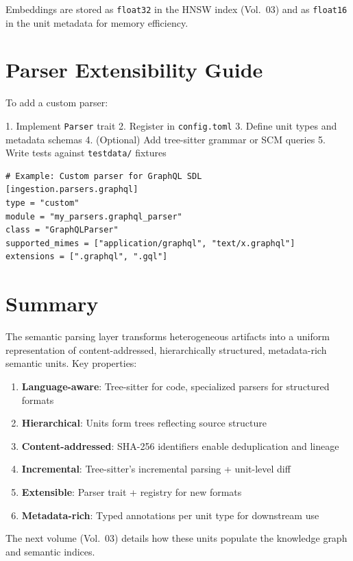 Embeddings are stored as \texttt{float32} in the HNSW index (Vol.~03) and as \texttt{float16} in the unit metadata for memory efficiency.

\section{Parser Extensibility Guide}
\label{sec:parsing:extensibility}

To add a custom parser:

1. Implement \texttt{Parser} trait
2. Register in \texttt{config.toml}
3. Define unit types and metadata schemas
4. (Optional) Add tree-sitter grammar or SCM queries
5. Write tests against \texttt{testdata/} fixtures

\begin{verbatim}
# Example: Custom parser for GraphQL SDL
[ingestion.parsers.graphql]
type = "custom"
module = "my_parsers.graphql_parser"
class = "GraphQLParser"
supported_mimes = ["application/graphql", "text/x.graphql"]
extensions = [".graphql", ".gql"]
\end{verbatim}

\section{Summary}
\label{sec:parsing:summary}

The semantic parsing layer transforms heterogeneous artifacts into a uniform representation of content-addressed, hierarchically structured, metadata-rich semantic units. Key properties:

\begin{enumerate}
  \item \textbf{Language-aware}: Tree-sitter for code, specialized parsers for structured formats
  \item \textbf{Hierarchical}: Units form trees reflecting source structure
  \item \textbf{Content-addressed}: SHA-256 identifiers enable deduplication and lineage
  \item \textbf{Incremental}: Tree-sitter's incremental parsing + unit-level diff
  \item \textbf{Extensible}: Parser trait + registry for new formats
  \item \textbf{Metadata-rich}: Typed annotations per unit type for downstream use
\end{enumerate}

The next volume (Vol.~03) details how these units populate the knowledge graph and semantic indices.

